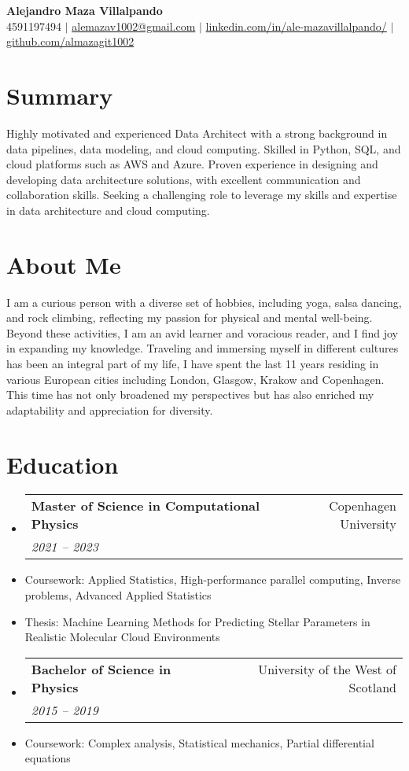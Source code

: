 \documentclass[letterpaper,10pt]{article}
\makeatletter
\newcommand{\resumeItem}[1]{\item\small{#1}}
\newcommand{\resumeSubheading}[4]{
\vspace{-1pt}\item
  \begin{tabular*}{0.97\textwidth}[t]{l@{\extracolsep{\fill}}r}
    \textbf{#1} & #2 \\
    \textit{#3} & \textit{#4} \\
  \end{tabular*}\vspace{-7pt}
}
\newcommand{\resumeSubHeadingList}{\begin{itemize}[leftmargin=0.15in, label={}]}
\newcommand{\resumeSubHeadingListEnd}{\end{itemize}}
\makeatother
\begin{document}
\begin{center}
  \textbf{\Huge Alejandro Maza Villalpando} \\
  \small 4591197494 $|$ \href{mailto:alemazav1002@gmail.com}{alemazav1002@gmail.com} $|$ 
  \href{https://www.linkedin.com/in/ale-mazavillalpando/}{linkedin.com/in/ale-mazavillalpando/} $|$
  \href{https://github.com/almazagit1002}{github.com/almazagit1002}
\end{center}

\section*{Summary}
Highly motivated and experienced Data Architect with a strong background in data pipelines, data modeling, and cloud computing. Skilled in Python, SQL, and cloud platforms such as AWS and Azure. Proven experience in designing and developing data architecture solutions, with excellent communication and collaboration skills. Seeking a challenging role to leverage my skills and expertise in data architecture and cloud computing.

\section*{About Me}
I am a curious person with a diverse set of hobbies, including yoga, salsa dancing, and rock climbing, reflecting my passion for physical and mental well-being. Beyond these activities, I am an avid learner and voracious reader, and I find joy in expanding my knowledge. Traveling and immersing myself in different cultures has been an integral part of my life, I have spent the last 11 years residing in various European cities including London, Glasgow, Krakow and Copenhagen. This time has not only broadened my perspectives but has also enriched my adaptability and appreciation for diversity.

\section{Education}
\resumeSubHeadingList
  \resumeSubheading
    {Master of Science in Computational Physics}{Copenhagen University}{2021 -- 2023}{}
    \resumeItem{Coursework: Applied Statistics, High-performance parallel computing, Inverse problems, Advanced Applied Statistics}
    \resumeItem{Thesis: Machine Learning Methods for Predicting Stellar Parameters in Realistic Molecular Cloud Environments}
  \resumeSubheading
    {Bachelor of Science in Physics}{University of the West of Scotland}{2015 -- 2019}{}
    \resumeItem{Coursework: Complex analysis, Statistical mechanics, Partial differential equations}
\resumeSubHeadingListEnd
\end{document}
